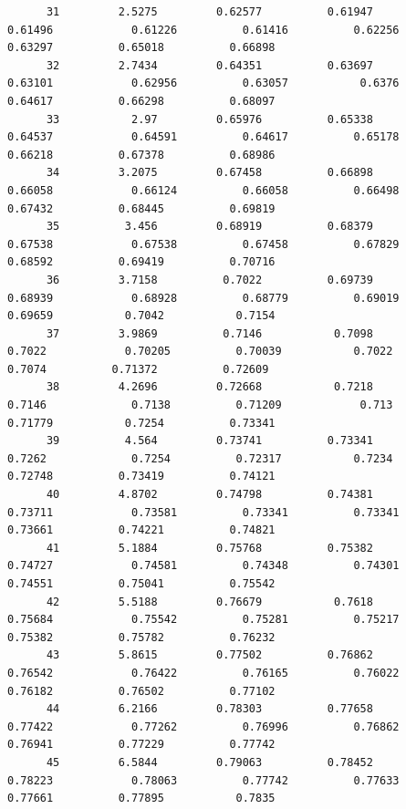 \documentclass[
]{book}
\begin{document}
\begin{verbatim}
      31         2.5275         0.62577          0.61947           0.61496            0.61226          0.61416          0.62256          0.63297          0.65018          0.66898   
      32         2.7434         0.64351          0.63697           0.63101            0.62956          0.63057           0.6376          0.64617          0.66298          0.68097   
      33           2.97         0.65976          0.65338           0.64537            0.64591          0.64617          0.65178          0.66218          0.67378          0.68986   
      34         3.2075         0.67458          0.66898           0.66058            0.66124          0.66058          0.66498          0.67432          0.68445          0.69819   
      35          3.456         0.68919          0.68379           0.67538            0.67538          0.67458          0.67829          0.68592          0.69419          0.70716   
      36         3.7158          0.7022          0.69739           0.68939            0.68928          0.68779          0.69019          0.69659           0.7042           0.7154   
      37         3.9869          0.7146           0.7098            0.7022            0.70205          0.70039           0.7022           0.7074          0.71372          0.72609   
      38         4.2696         0.72668           0.7218            0.7146             0.7138          0.71209            0.713          0.71779           0.7254          0.73341   
      39          4.564         0.73741          0.73341            0.7262             0.7254          0.72317           0.7234          0.72748          0.73419          0.74121   
      40         4.8702         0.74798          0.74381           0.73711            0.73581          0.73341          0.73341          0.73661          0.74221          0.74821   
      41         5.1884         0.75768          0.75382           0.74727            0.74581          0.74348          0.74301          0.74551          0.75041          0.75542   
      42         5.5188         0.76679           0.7618           0.75684            0.75542          0.75281          0.75217          0.75382          0.75782          0.76232   
      43         5.8615         0.77502          0.76862           0.76542            0.76422          0.76165          0.76022          0.76182          0.76502          0.77102   
      44         6.2166         0.78303          0.77658           0.77422            0.77262          0.76996          0.76862          0.76941          0.77229          0.77742   
      45         6.5844         0.79063          0.78452           0.78223            0.78063          0.77742          0.77633          0.77661          0.77895           0.7835   

\end{verbatim}
\end{document}
